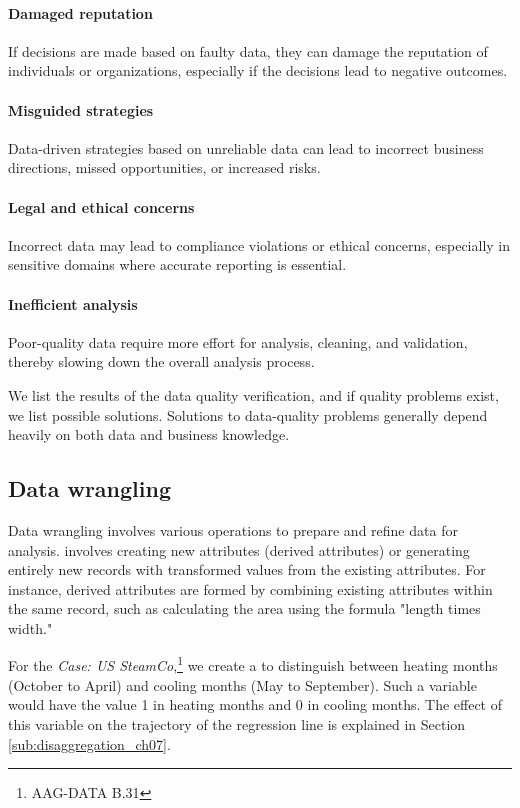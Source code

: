 \paragraph{Damaged reputation} If decisions are made based on faulty data, they can damage the reputation of individuals or organizations, especially if the decisions lead to negative outcomes.
\paragraph{Misguided strategies} Data-driven strategies based on unreliable data can lead to incorrect business directions, missed opportunities, or increased risks.
\paragraph{Legal and ethical concerns} Incorrect data may lead to compliance violations or ethical concerns, especially in sensitive domains where accurate reporting is essential.
\paragraph{Inefficient analysis} Poor-quality data require more effort for analysis, cleaning, and validation, thereby slowing down the overall analysis process.

\bigskip
We list the results of the data quality verification, and if quality problems exist, we list possible solutions. Solutions to data-quality problems generally depend heavily on both data and business knowledge.


\subsection{Data wrangling} %
\label{sub:data_wrangling}

Data wrangling involves various operations to prepare and refine data for analysis.  involves creating new attributes (derived attributes) or generating entirely new records with transformed values from the existing attributes. For instance, derived attributes are formed by combining existing attributes within the same record, such as calculating the area using the formula "length times width."

For the \textit{Case: US SteamCo},\footnote{AAG-DATA B.31} we create a  to distinguish between heating months (October to April) and cooling months (May to September). 
Such a variable would have the value 1 in heating months and 0 in cooling months. 
The effect of this variable on the trajectory of the regression line is explained in Section \ref{sub:disaggregation_ch07}.

